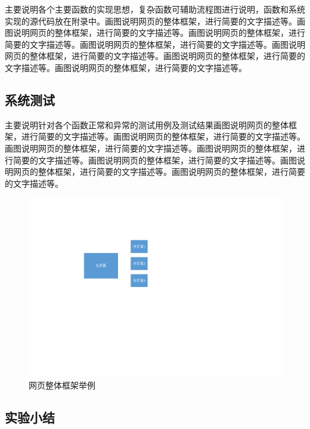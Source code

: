 \documentclass[supercite]{Experimental_Report}
\theoremstyle{definition}
\begin{document}
主要说明各个主要函数的实现思想，复杂函数可辅助流程图进行说明，函数和系统实现的源代码放在附录中。画图说明网页的整体框架，进行简要的文字描述等。画图说明网页的整体框架，进行简要的文字描述等。画图说明网页的整体框架，进行简要的文字描述等。画图说明网页的整体框架，进行简要的文字描述等。画图说明网页的整体框架，进行简要的文字描述等。画图说明网页的整体框架，进行简要的文字描述等。画图说明网页的整体框架，进行简要的文字描述等。

\subsection{系统测试}

主要说明针对各个函数正常和异常的测试用例及测试结果画图说明网页的整体框架，进行简要的文字描述等。画图说明网页的整体框架，进行简要的文字描述等。画图说明网页的整体框架，进行简要的文字描述等。画图说明网页的整体框架，进行简要的文字描述等。画图说明网页的整体框架，进行简要的文字描述等。画图说明网页的整体框架，进行简要的文字描述等。画图说明网页的整体框架，进行简要的文字描述等。

\begin{figure}[htb] %
	\begin{center}
		\includegraphics[scale=0.80]{images/1-1.pdf}
		\caption{网页整体框架举例}
		\label{fig4-1}
	\end{center}
\end{figure}

\subsection{实验小结}

\newpage
\end{document}
